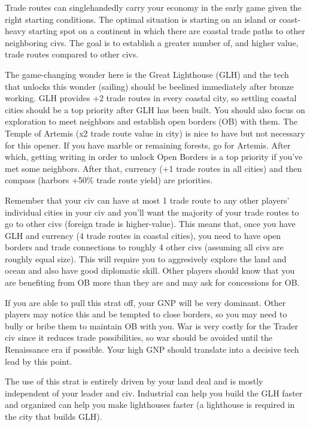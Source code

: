 \documentclass[10pt]{article}
\begin{document}
Trade routes can singlehandedly carry your economy in the early game
given the right starting conditions.  The optimal situation is
starting on an island or coast-heavy starting spot on a continent in
which there are coastal trade paths to other neighboring civs. The
goal is to establish a greater number of, and higher value, trade
routes compared to other civs.

The game-changing wonder here is the Great Lighthouse (GLH) and the
tech that unlocks this wonder (sailing) should be beelined immediately
after bronze working. GLH provides +2 trade routes in every coastal
city, so settling coastal cities should be a top priority after GLH
has been built. You should also focus on exploration to meet neighbors
and establish open borders (OB) with them.  The Temple of Artemis (x2
trade route value in city) is nice to have but not necessary for this
opener.  If you have marble or remaining forests, go for
Artemis. After which, getting writing in order to unlock Open Borders
is a top priority if you've met some neighbors. After that, currency
(+1 trade routes in all cities) and then compass (harbors +50\% trade
route yield) are priorities.

Remember that your civ can have at most 1 trade route to any other
players' individual cities in your civ and you'll want the majority of
your trade routes to go to other civs (foreign trade is
higher-value). This means that, once you have GLH and currency (4
trade routes in coastal cities), you need to have open borders and
trade connections to roughly 4 other civs (assuming all civs are
roughly equal size). This will require you to aggresively explore the
land and ocean and also have good diplomatic skill. Other players
should know that you are benefiting from OB more than they are and may
ask for concessions for OB.

If you are able to pull this strat off, your GNP will be very
dominant. Other players may notice this and be tempted to close
borders, so you may need to bully or bribe them to maintain OB with
you. War is very costly for the Trader civ since it reduces trade
possibilities, so war should be avoided until the Renaissance era if
possible. Your high GNP should translate into a decisive tech lead by
this point.

The use of this strat is entirely driven by your land deal and is
mostly independent of your leader and civ. Industrial can help you
build the GLH faster and organized can help you make lighthouses
faster (a lighthouse is required in the city that builds GLH).
\end{document}
